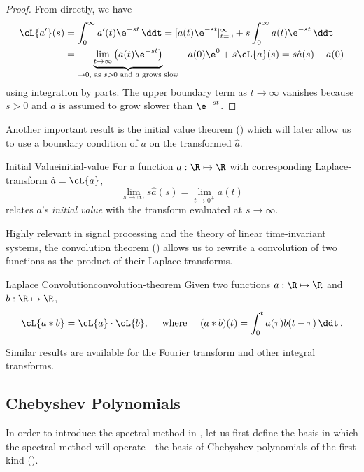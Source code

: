 \documentclass{prettytex/ox/mmsc-special-topic}
\begin{document}
  \begin{proof}
    From  directly, we have
    \begin{align*}
      \cL\{a'\}(s) & = \int_{0}^{\infty} a'(t) \e^{-st} \,\ddt = [a(t) \e^{-st}]_{t=0}^{\infty} + s \int_{0}^{\infty} a(t) \e^{-st} \,\ddt                                                                         \\
                   & = \underbrace{\lim_{t \rightarrow \infty} \left(a(t) \e^{-st}\right)}_{\rightarrow 0, \text{ as } s > 0 \text{ and } a \text{ grows slow}} - a(0) \e^{0} + s \cL\{a\}(s) = s\hat{a}(s) - a(0)
    \end{align*}
    using integration by parts. The upper boundary term as $t \rightarrow \infty$ vanishes because $s > 0$ and $a$ is assumed to grow slower than $\e^{-st}$.
  \end{proof}

  Another important result is the initial value theorem () which will later allow us to use a boundary condition of $a$ on the transformed $\hat{a}$.

  \begin{theorem}{Initial Value}{initial-value}
    For a function $a: \R \mapsto \R$ with corresponding Laplace-transform $\hat{a} = \cL\{a\}$,
    $$\lim_{s \rightarrow \infty} s \hat{a}(s) = \lim_{t \rightarrow 0^+} a(t)$$
    relates $a$'s \textit{initial value} with the transform evaluated at $s \rightarrow \infty$.
  \end{theorem}

  Highly relevant in signal processing and the theory of linear time-invariant systems, the convolution theorem () allows us to rewrite a convolution of two functions as the product of their Laplace transforms.

  \begin{theorem}{Laplace Convolution}{convolution-theorem}
    Given two functions $a: \R \mapsto \R$ and $b: \R \mapsto \R$,
    $$\cL\{a * b\} = \cL\{a\} \cdot \cL\{b\}, \quad \text{ where }\quad (a * b)(t) = \int_{0}^{t} a(\tau) b(t-\tau)\,\ddt\,.$$
  \end{theorem}

  Similar results are available for the Fourier transform and other integral transforms.

  \subsection{Chebyshev Polynomials}
  In order to introduce the spectral method in , let us first define the basis in which the spectral method will operate - the basis of Chebyshev polynomials of the first kind ().
\end{document}
